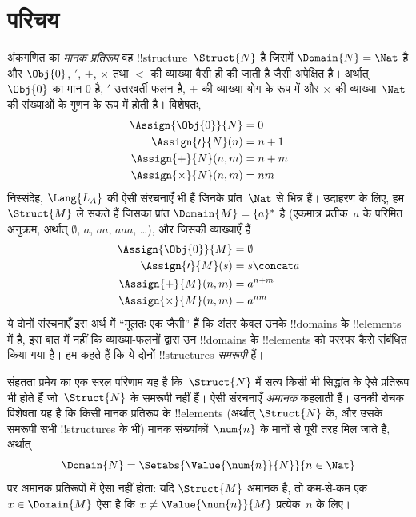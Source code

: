 \documentclass[../../../include/open-logic-section]{subfiles}
\begin{document}
\section{परिचय}

अंकगणित का \emph{मानक प्रतिरूप} वह
!!{structure}~$\Struct{N}$ है जिसमें $\Domain{N} = \Nat$ है और
$\Obj{0}$, $\prime$, $+$, $\times$ तथा $<$ की व्याख्या वैसी ही की जाती
है जैसी अपेक्षित है। अर्थात् $\Obj{0}$ का मान $0$ है, $\prime$ उत्तरवर्ती
फलन है, $+$ की व्याख्या योग के रूप में और $\times$ की व्याख्या~$\Nat$ की
संख्याओं के गुणन के रूप में होती है। विशेषतः,
\begin{align*}
  \Assign{\Obj{0}}{N} & = 0\\
  \Assign{\prime}{N}(n) & = n + 1\\
  \Assign{+}{N}(n, m) & = n + m\\
  \Assign{\times}{N}(n, m) & = nm
\end{align*}
निस्संदेह, $\Lang{L_A}$ की ऐसी संरचनाएँ भी हैं जिनके प्रांत~$\Nat$ से
भिन्न हैं। उदाहरण के लिए, हम $\Struct{M}$ ले सकते हैं जिसका प्रांत
$\Domain{M} = \{a\}^*$ है (एकमात्र प्रतीक~$a$ के परिमित अनुक्रम, अर्थात्
$\emptyset$, $a$, $aa$, $aaa$, \dots), और जिसकी व्याख्याएँ हैं
\begin{align*}
  \Assign{\Obj{0}}{M} & = \emptyset\\
  \Assign{\prime}{M}(s) & = s \concat a\\
  \Assign{+}{M}(n, m) & = a^{n + m}\\
  \Assign{\times}{M}(n, m) & = a^{nm}
\end{align*}
ये दोनों संरचनाएँ इस अर्थ में “मूलतः एक जैसी” हैं कि अंतर केवल उनके
!!{domain}s के !!{element}s में है, इस बात में नहीं कि व्याख्या-फलनों द्वारा
उन !!{domain}s के !!{element}s को परस्पर कैसे संबंधित किया गया है। हम कहते
हैं कि ये दोनों !!{structure}s \emph{समरूपी} हैं।

संहतता प्रमेय का एक सरल परिणाम यह है कि~$\Struct{N}$ में सत्य किसी भी
सिद्धांत के ऐसे प्रतिरूप भी होते हैं जो~$\Struct{N}$ के समरूपी नहीं हैं।
ऐसी संरचनाएँ \emph{अमानक} कहलाती हैं। उनकी रोचक विशेषता यह है कि किसी मानक
प्रतिरूप के !!{element}s (अर्थात् $\Struct{N}$ के, और उसके समरूपी सभी
!!{structure}s के भी) मानक संख्यांकों~$\num{n}$ के मानों से पूरी तरह मिल
जाते हैं, अर्थात्
\[
\Domain{N} = \Setabs{\Value{\num{n}}{N}}{n \in \Nat}
\]
पर अमानक प्रतिरूपों में ऐसा नहीं होता: यदि $\Struct{M}$ अमानक है, तो कम-से-कम
एक $x \in \Domain{M}$ ऐसा है कि $x \neq \Value{\num{n}}{M}$ प्रत्येक~$n$ के
लिए।
\end{document}
